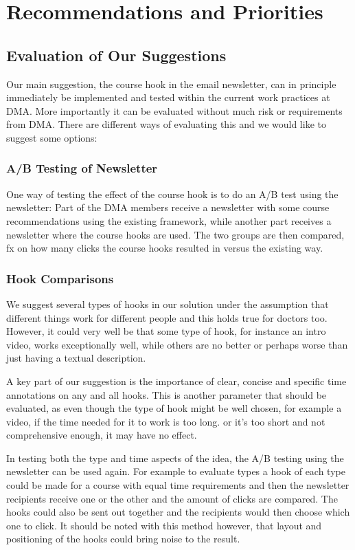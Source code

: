 \section{Recommendations and Priorities}
\subsection{Evaluation of Our Suggestions}

Our main suggestion, the course hook in the email newsletter, can in principle immediately be implemented and tested within the current work practices at DMA. More importantly it can be evaluated without much risk or requirements from DMA. There are different ways of evaluating this and we would like to suggest some options:

\subsubsection{A/B Testing of Newsletter}
One way of testing the effect of the course hook is to do an A/B test using the newsletter: Part of the DMA members receive a newsletter with some course recommendations using the existing framework, while another part receives a newsletter where the course hooks are used. The two groups are then compared, fx on how many clicks the course hooks resulted in versus the existing way. 

\subsubsection{Hook Comparisons}
We suggest several types of hooks in our solution under the assumption that different things work for different people and this holds true for doctors too. However, it could very well be that some type of hook, for instance an intro video, works exceptionally well, while others are no better or perhaps worse than just having a textual description. 

A key part of our suggestion is the importance of clear, concise and specific time annotations on any and all hooks. This is another parameter that should be evaluated, as even though the type of hook might be well chosen, for example a video, if the time needed for it to work is too long. or it’s too short and not comprehensive enough, it may have no effect. 

In testing both the type and time aspects of the idea, the A/B testing using the newsletter can be used again. For example to evaluate types a hook of each type could be made for a course with equal time requirements and then the newsletter recipients receive one or the other and the amount of clicks are compared. The hooks could also be sent out together and the recipients would then choose which one to click. It should be noted with this method however, that layout and positioning of the hooks could bring noise to the result. 

